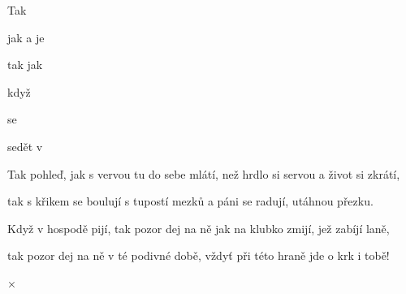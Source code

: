 

    

\zs
Tak    

jak   a  je 

tak   jak  

když    
\ks

\zr
{}   se 

 sedět v   

   

   
\kr

\zs
Tak pohleď, jak s vervou tu do sebe mlátí, než hrdlo si servou a život si zkrátí,

tak s křikem se boulují s tupostí mezků a páni se radují, utáhnou přezku.
\ks

\zr\kr

\zs
Když v hospodě pijí, tak pozor dej na ně jak na klubko zmijí, jež zabíjí laně,

tak pozor dej na ně v té podivné době, vždyť při této hraně jde o krk i tobě!
\ks

× \kr

\kp
